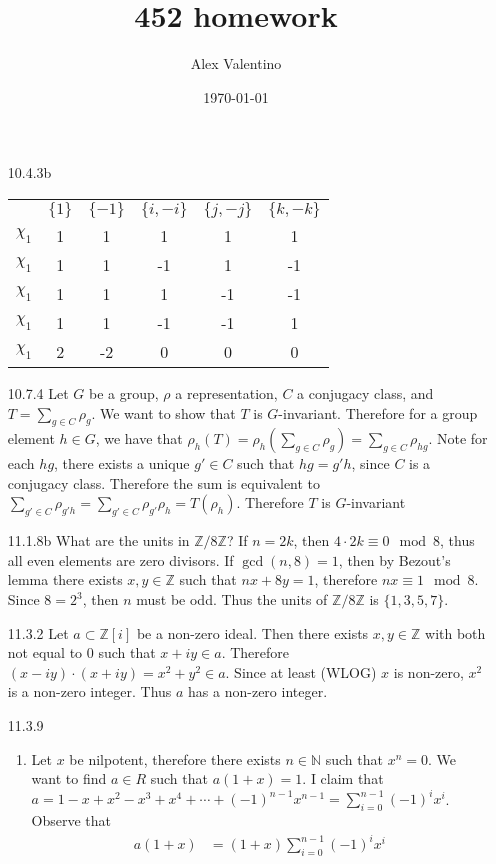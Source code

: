 \documentclass[12pt, letterpaper]{article}
\date{\today}
\author{Alex Valentino}
\title{452 homework}
\newcommand{\Z}{\mathbb{Z}}
\newcommand{\N}{\mathbb{N}}
\begin{document}
\begin{enumerate}
	\item[10.4.3b] 
	\begin{tabular}{c|ccccc}
	& $\{1\}$ & $\{-1\}$ & $\{i,-i\}$ & $\{j,-j\}$ & $\{k,-k\}$\\
	$\chi_1$ & 1 & 1 & 1 & 1 & 1\\
	$\chi_1$ & 1 & 1 & -1 & 1 & -1\\
	$\chi_1$ & 1 & 1 & 1 & -1 & -1\\
	$\chi_1$ & 1 & 1 & -1 & -1 & 1\\
	$\chi_1$ & 2 & -2 & 0 & 0 & 0\\
	\end{tabular}
	\item[10.7.4] Let $G$ be a group, $\rho$ a representation, $C$ a conjugacy class, and 
	$T = \sum_{g \in C}\rho_g$.  We want to show 
	that $T$ is $G$-invariant.  Therefore 
	for a group element $h\in G$, we have that 
	$\rho_h(T) = \rho_h(\sum_{g \in C} \rho_{g}) = \sum_{g \in C} \rho_{hg}$.  Note for each $hg$, there exists 
	a unique $g' \in C$ such that $hg = g'h$, since $C$ is a conjugacy class.  Therefore 
	the sum is equivalent to 
	$\sum_{g' \in C} \rho_{g'h} = \sum_{g' \in C} \rho_{g'} \rho_h = T(\rho_h)$.  Therefore $T$ is $G$-invariant 
	\item[11.1.8b] What are the units in $\Z/8\Z$?  
	If $n = 2k$, then $4\cdot 2k \equiv 0 \mod{8}$, thus 
	all even elements are zero divisors.  If $\gcd(n,8) = 
	1$, then by Bezout's lemma there exists $x,y \in \Z$
	such that $nx + 8y = 1$, therefore $nx\equiv 1 \mod{8}$.
	Since $8=2^3$, then $n$ must be odd.  Thus the 
	units of $\Z/8\Z$ is $\{1,3,5,7\}$.  
	\item[11.3.2] Let $a \subset \Z[i]$ be a non-zero ideal.
	Then there exists $x,y\in \Z$ with both not 
	equal to 0 such that 
	$x+ iy \in a$.  Therefore 
	$(x-iy)\cdot (x+iy) = x^2 + y^2 \in a$.  Since at least 
	(WLOG) $x$ is non-zero, $x^2$ is a non-zero integer.
	Thus $a$ has a non-zero integer.    	
	\item[11.3.9]
	\begin{enumerate}
		\item Let $x$ be nilpotent, therefore there 
		exists $n \in \N$ such that $x^n = 0$.  We 
		want to find $a \in R$ such that 
		$a(1+x) = 1$.  I claim that 
		$a = 1 - x + x^2 - x^3 + x^4 + \cdots + 
		(-1)^{n-1} x^{n-1} = \sum_{i=0}^{n-1} (-1)^i x^i$.
		Observe that 
		\begin{align*}
		a(1+x) &= (1+x)\sum_{i=0}^{n-1} (-1)^i x^i\\

\end{align*}
\end{enumerate}
\end{enumerate}
\end{document}
